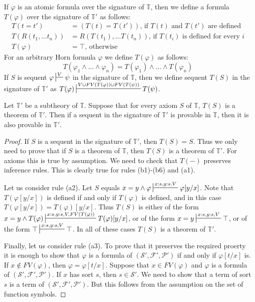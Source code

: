\documentclass{amsart}
\theoremstyle{definition}
\theoremstyle{remark}
\numberwithin{figure}{section}
\begin{document}
If $\varphi$ is an atomic formula over the signature of $\mathbb{T}$, then we define a formula $T(\varphi)$ over the signature of $\mathbb{T}'$ as follows:
\begin{align*}
T(t = t') & = (T(t) = T(t')) \text{, if $T(t)$ and $T(t')$ are defined} \\
T(R(t_1, \ldots t_n)) & = R(T(t_1), \ldots T(t_n)) \text{, if $T(t_i)$ is defined for every $i$} \\
T(\varphi) & = \top \text{, otherwise}
\end{align*}
For an arbitrary Horn formula $\varphi$ we define $T(\varphi)$ as follows:
\[ T(\varphi_1 \land \ldots \land \varphi_n) = T(\varphi_1) \land \ldots \land T(\varphi_n) \]
If $S$ is sequent $\varphi \sststile{}{V} \psi$ in the signature of $\mathbb{T}$,
then we define sequent $T(S)$ in the signature of $\mathbb{T}'$ as $T(\varphi) \sststile{}{V \cup FV(T(\varphi)) \cup FV(T(\psi))} T(\psi)$.

\begin{lem}[mono]
Let $\mathbb{T}'$ be a subtheory of $\mathbb{T}$.
Suppose that for every axiom $S$ of $\mathbb{T}$, $T(S)$ is a theorem of $\mathbb{T}'$.
Then if a sequent in the signature of $\mathbb{T}'$ is provable in $\mathbb{T}$, then it is also provable in $\mathbb{T}'$.
\end{lem}
\begin{proof}
If $S$ is a sequent in the signature of $\mathbb{T}'$, then $T(S) = S$.
Thus we only need to prove that if $S$ is a theorem of $\mathbb{T}$, then $T(S)$ is a theorem of $\mathbb{T}'$.
For axioms this is true by assumption.
We need to check that $T(-)$ preserves inference rules.
This is clearly true for rules (b1)-(b6) and (a1).

Let us consider rule (a2).
Let $S$ equals $x = y \land \varphi \sststile{}{x:s,y:s,V} \varphi[y/x]$.
Note that $T(\varphi[y/x])$ is defined if and only if $T(\varphi)$ is defined, and in this case $T(\varphi[y/x]) = T(\varphi)[y/x]$.
Thus $T(S)$ is either of the form $x = y \land T(\varphi) \sststile{}{x:s,y:s,V,FV(T(\varphi))} T(\varphi)[y/x]$,
or of the form $x = y \sststile{}{x:s,y:s,V} \top$, or of the form $\top \sststile{}{x:s,y:s,V} \top$.
In all of these cases $T(S)$ is a theorem of $\mathbb{T}'$.

Finally, let us consider rule (a3).
To prove that it preserves the required proerty it is enough to show that $\varphi$ is a formula of $(\mathcal{S}',\mathcal{F}',\mathcal{P}')$ if and only if $\varphi[t/x]$ is.
If $x \notin FV(\varphi)$, then $\varphi = \varphi[t/x]$.
Suppose that $x \in FV(\varphi)$ and $\varphi$ is a formula of $(\mathcal{S}',\mathcal{F}',\mathcal{P}')$.
If $x$ has sort $s$, then $s \in \mathcal{S}'$.
We need to show that a term of sort $s$ is a term of $(\mathcal{S}',\mathcal{F}',\mathcal{P}')$.
But this follows from the assumption on the set of function symbols.
\end{proof}
\end{document}
